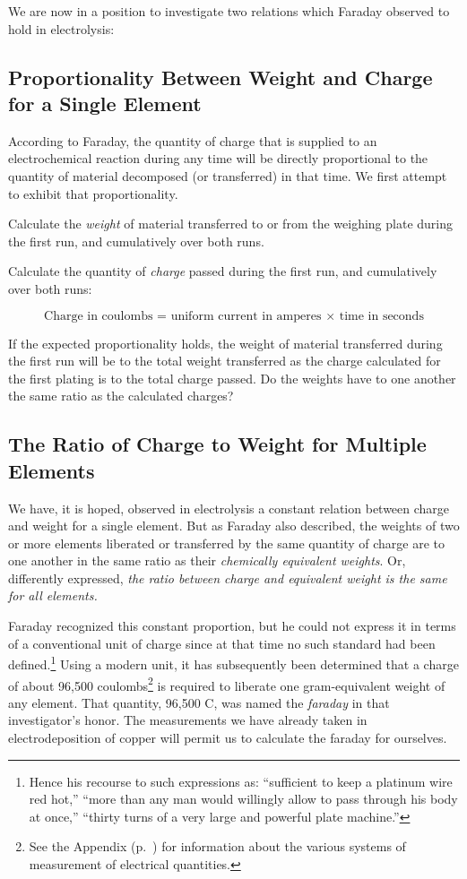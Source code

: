 We are now in a position to investigate two relations which Faraday
observed to hold in electrolysis:

\subsection{Proportionality Between Weight and Charge for a Single Element}

According to Faraday, the quantity of charge that is supplied to an
electrochemical reaction during any time will be directly proportional
to the quantity of material de\-com\-posed (or transferred) in that time. We
first attempt to exhibit that proportionality.

Calculate the \emph{weight} of material transferred to or from the
weighing plate during the first run, and cumulatively over both runs.

Calculate the quantity of \emph{charge} passed during the first run, and
cumulatively over both runs:

\begin{equation*}
\text{Charge in coulombs = uniform current in amperes $\times$ time in seconds}
\end{equation*}

If the expected proportionality holds, the weight of material
transferred during the first run will be to the total weight transferred
as the charge calculated for the first plating is to the total charge
passed. Do the weights have to one another the same ratio as the
calculated charges?

\subsection{The Ratio of Charge to Weight for Multiple Elements}

We have, it is hoped, observed in electrolysis a constant relation
between charge and weight for a single element. But as Faraday also
described, the weights of two or more elements liberated or transferred
by the same quantity of charge are to one another in the same ratio as
their \emph{chemically equivalent weights}. Or, differently expressed,
\emph{the ratio between charge and equivalent weight is the same for all
elements.}

Faraday recognized this constant proportion, but he could not express it
in terms of a conventional unit of charge since at that time no such
standard had been defined.\footnote{Hence his recourse to such
  expressions as: ``sufficient to keep a platinum wire red hot,'' ``more
  than any man would willingly allow to pass through his body at once,''
  ``thirty turns of a very large and powerful plate machine.''} Using a
modern unit, it has subsequently been determined that a charge of about
96,500 coulombs\footnote{See the Appendix (p.~\pageref{ch:appendix})
for information about the various systems of measurement of electrical quantities.} 
is required to liberate one gram-equivalent weight of any element. That
quantity, 96,500 C, was named the \emph{faraday} in that
investigator's honor. The mea\-sure\-ments we have already taken in
electrodeposition of copper will permit us to calculate the faraday for
ourselves.


